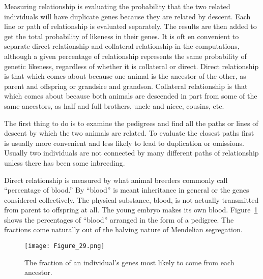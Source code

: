 Measuring relationship is evaluating the probability that the two
related individuals will have duplicate genes because they are related
by descent. Each line or path of relationship is evaluated separately.
The results are then added to get the total probability of likeness in
their genes. It is oft en convenient to separate direct relationship and
collateral relationship in the computations, although a given percentage
of relationship represents the same probability of genetic likeness,
regardless of whether it is collateral or direct. Direct relationship is that
which comes about because one animal is the ancestor of the other, as
parent and offspring or grandsire and grandson. Collateral relationship
is that which comes about because both animals are descended in part
from some of the same ancestors, as half and full brothers, uncle and
niece, cousins, etc.

The first thing to do is to examine the pedigrees and find all the
paths or lines of descent by which the two animals are related. To evaluate
the closest paths first is usually more convenient and less likely to
lead to duplication or omissions. Usually two individuals are not connected
by many different paths of relationship unless there has been
some inbreeding.

Direct relationship is measured by what animal breeders commonly
call ``percentage of blood.'' By ``blood'' is meant inheritance in general
or the genes considered collectively. The physical substance, blood, is
not actually transmitted from parent to offspring at all. The young
embryo makes its own blood. Figure~\ref{fig:Lush_Figure_29} shows the percentages of
``blood'' arranged in the form of a pedigree. The fractions come naturally
out of the halving nature of Mendelian segregation.

\begin{figure}
	\centering
    \texttt{[image: Figure\_29.png]}
    \caption{The fraction of an individual's genes most likely to come from each ancestor.}
    \label{fig:Lush_Figure_29}
\end{figure}

